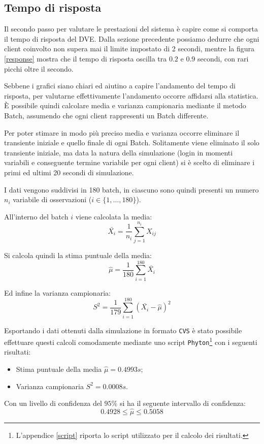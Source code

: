\documentclass[a4paper, 11pt, oneside]{book}
\theoremstyle{definition}
\theoremstyle{remark}
\begin{document}
\subsection{Tempo di risposta}
Il secondo passo per valutare le prestazioni del sistema è capire come si
comporta il tempo di risposta del DVE. Dalla sezione precedente possiamo
dedurre che ogni client coinvolto non supera mai il limite impostato di 2
secondi, mentre la figura \ref{response} mostra che il tempo di risposta
oscilla tra $0.2$ e $0.9$ secondi, con rari picchi oltre il secondo.

Sebbene i grafici siano chiari ed aiutino a capire l'andamento del tempo
di risposta, per valutarne effettivamente l'andamento occorre affidarsi alla
statistica. \`E possibile quindi calcolare media e varianza campionaria
mediante il metodo Batch, assumendo che ogni client rappresenti un Batch
differente.

Per poter stimare in modo più preciso media e varianza occorre eliminare
il transiente iniziale e quello finale di ogni Batch. Solitamente viene
eliminato il solo transiente iniziale, ma data la natura della simulazione
(login in momenti variabili e conseguente termine variabile per ogni client)
si è scelto di eliminare i primi ed ultimi 20 secondi di simulazione.

I dati vengono suddivisi in 180 batch, in ciascuno sono quindi presenti un
numero $n_i$ variabile di osservazioni ($i \in \{1, \ldots, 180\}$).

All'interno del batch $i$ viene calcolata la media:
\[
\bar{X_i} = \frac{1}{n_i} \sum_{j=1}^{n_i} X_{ij}
\]

Si calcola quindi la stima puntuale della media:
\[
\hat{\mu} = \frac{1}{180}\sum_{i=1}^{180}\bar{X_i}
\]

Ed infine la varianza campionaria:
\[
S^2 = \frac{1}{179} \sum_{i=1}^{180}\left( \bar{X_i} - \hat{\mu}\right)^2
\]

Esportando i dati ottenuti dalla simulazione in formato \texttt{CVS} è stato
possibile effettuare questi calcoli comodamente mediante uno script
\texttt{Phyton}\footnote{L'appendice \ref{script} riporta lo script utilizzato
per il calcolo dei risultati.}
con i seguenti risultati:
\begin{itemize}
\item
Stima puntuale della media $\hat{\mu} = 0.4993s$;
\item
Varianza campionaria $S^2 = 0.0008s$.
\end{itemize}
Con un livello di confidenza del $95$\% si ha il seguente intervallo di
confidenza:
\[
0.4928 \le \hat{\mu} \le 0.5058
\]
\end{document}
